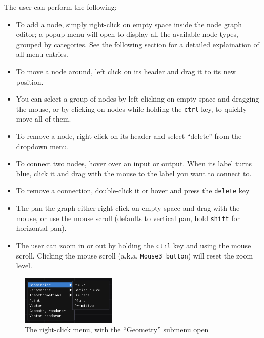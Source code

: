 The user can perform the following:
\begin{itemize}
    \item To add a node, simply right-click on empty space inside the node graph editor;
            a popup menu will open to display all the available node types, grouped by categories.
            See the following section for a detailed explaination of all menu entries.

    \item To move a node around, left click on its header and drag it to its new position.

    \item You can select a group of nodes by left-clicking on empty space and dragging the mouse,
            or by clicking on nodes while holding the \texttt{ctrl} key, to quickly move all of them.

    \item To remove a node, right-click on its header and select ``delete'' from the dropdown menu.

    \item To connect two nodes, hover over an input or output. When its label turns blue, click it
            and drag with the mouse to the label you want to connect to. 

    \item To remove a connection, double-click it or hover and press the \texttt{delete} key

    \item The pan the graph either right-click on empty space and drag with the mouse,
        or use the mouse scroll (defaults to vertical pan, hold \texttt{shift} for horizontal pan).

    \item The user can zoom in or out by holding the \texttt{ctrl} key and using the mouse scroll.
        Clicking the mouse scroll (a.k.a. \texttt{Mouse3 button}) will reset the zoom level.

\end{itemize}

\begin{figure}[H]
\centering
\includegraphics[width=0.4\textwidth]{figures/right_click_popup.png}
\caption{\label{fig:rightclick_manu} The right-click menu, with the ``Geometry'' submenu open}
\end{figure}

